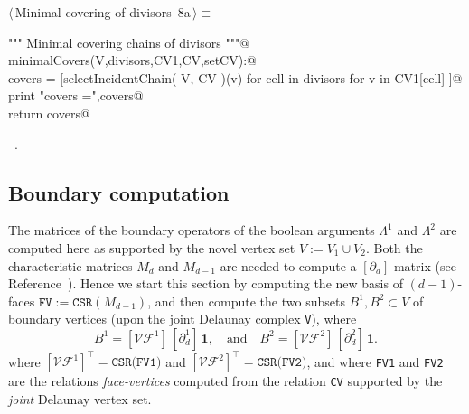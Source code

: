 \documentclass[11pt,oneside]{article}	%
\begin{document}
\begin{flushleft} \small \label{scrap14}
\protect{}$\langle\,$Minimal covering of divisors\nobreak\ {\footnotesize 8a}$\,\rangle\equiv$
\vspace{-1ex}
\begin{list}{}{} \item
\mbox{}\verb@""" Minimal covering chains of divisors """@\\
\mbox{}\verb@def minimalCovers(V,divisors,CV1,CV,setCV):@\\
\mbox{}\verb@   covers = [selectIncidentChain( V, CV )(v) for cell in divisors for v in CV1[cell] ]@\\
\mbox{}\verb@   print "\n covers =",covers@\\
\mbox{}\verb@   return covers@\\
\mbox{}\verb@@{\NWsep}
\end{list}
\vspace{-1ex}
\footnotesize\addtolength{\baselineskip}{-1ex}
\begin{list}{}{\setlength{\itemsep}{-\parsep}\setlength{\itemindent}{-\leftmargin}}
\item \NWtxtMacroRefIn\ .
\end{list}
\end{flushleft}




\subsection{Boundary computation}
The matrices of the boundary operators of the boolean arguments $\Lambda^1$ and $\Lambda^2$ are computed here as supported by the novel vertex set $V := V_1 \cup V_2$. Both the characteristic matrices $M_d$ and $M_{d-1}$ are needed to compute a $[\partial_d]$ matrix (see Reference~\cite{Dicarlo:2014:TNL:2543138.2543294}). Hence we start this section by computing the new basis of $(d-1)$-faces $\texttt{FV} := \texttt{CSR}(M_{d-1})$, and then compute the two subsets $B^1,B^2 \subset V$ of boundary vertices (upon the joint Delaunay complex \texttt{V}), where
\[
B^1 = [\mathcal{VF}^1]\, [\partial_d^1]\,\mathbf{1},
\quad\mbox{and}\quad
B^2 = [\mathcal{VF}^2]\, [\partial_d^2]\,\mathbf{1}.
\]
where $[\mathcal{VF}^1]^\top = \texttt{CSR(FV1)}$ and $[\mathcal{VF}^2]^\top = \texttt{CSR(FV2)}$,
and where \texttt{FV1} and \texttt{FV2} are the relations \emph{face-vertices} computed from the relation \texttt{CV} supported by the \emph{joint} Delaunay vertex set. 
\end{document}
